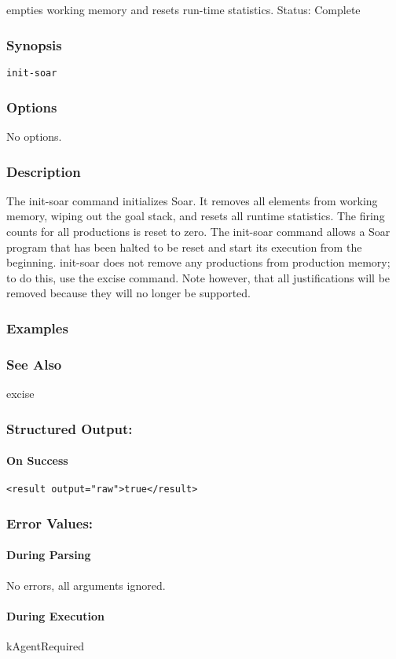 \subsection{}
\label{init-soar}
empties working memory and resets run-time statistics. 
 Status: Complete
\subsubsection*{Synopsis}
\begin{verbatim}
init-soar
\end{verbatim}
\subsubsection*{Options}
 No options. 
\subsubsection*{Description}
 The init-soar command initializes Soar. It removes all elements from working memory, wiping out the goal stack, and resets all runtime statistics. The firing counts for all productions is reset to zero. The init-soar command allows a Soar program that has been halted to be reset and start its execution from the beginning. 
 init-soar does not remove any productions from production memory; to do this, use the excise command. Note however, that all justifications will be removed because they will no longer be supported. 
\subsubsection*{Examples}
\subsubsection*{See Also}
 excise
\subsubsection*{Structured Output:}
\paragraph*{On Success}
\begin{verbatim}
<result output="raw">true</result>
\end{verbatim}
\subsubsection*{Error Values:}
\paragraph*{During Parsing}
 No errors, all arguments ignored. 
\paragraph*{During Execution}
 kAgentRequired
